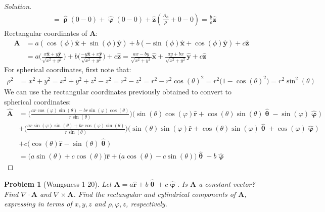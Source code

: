 \documentclass{article}
\theoremstyle{mystyle}
\newtheorem{problem}{Problem}[section]
\begin{document}
\begin{proof}[Solution]
\begin{align*}
    &=\hat{\boldsymbol{\uprho}}(0-0)+\hat{\boldsymbol{\upvarphi}}(0-0)+\hat{\mathbf{z}}(\frac{A_\phi}{\rho} +0-0)=\frac{b}{\rho}\hat{\mathbf{z}}
\end{align*}
Rectangular coordinates of $\mathbf{A}$:
\begin{align*}
    \mathbf{A} &= a(\cos(\phi)\hat{\mathbf{x}}+\sin(\phi)\hat{\mathbf{y}})+b(-\sin(\phi)\hat{\mathbf{x}}+\cos(\phi)\hat{\mathbf{y}})+c\hat{\mathbf{z}}\\
    &= a\bigg(\frac{x\hat{\mathbf{x}}+y\hat{\mathbf{y}}}{\sqrt{x^2+y^2}}\bigg)+b\bigg(\frac{-y\hat{\mathbf{x}}+x\hat{\mathbf{y}}}{\sqrt{x^2+y^2}}\bigg)+c\hat{\mathbf{z}}=\frac{ax-by}{\sqrt{x^2+y^2}}\hat{\mathbf{x}}+\frac{ay+bx}{\sqrt{x^2+y^2}}\hat{\mathbf{y}}+c\hat{\mathbf{z}}
\end{align*}
For spherical coordinates, first note that:
\begin{align*}
    \rho^{2}&=x^{2}+y^{2}=x^2+y^2+z^2-z^2=r^2-z^2=r^{2}-r^{2}\cos(\theta)^2=r^2\big(1-\cos(\theta)^2\big)=r^2\sin^2(\theta)
\end{align*}
We can use the rectangular coordinates previously obtained to convert to spherical coordinates:
\begin{align*}
    \hat{\mathbf{A}} &= \bigg(\frac{ar\cos(\varphi)\sin(\theta)-br\sin(\varphi)\cos(\theta)}{r\sin(\theta)}\bigg)\big(\sin(\theta)\cos(\varphi)\hat{\mathbf{r}}+\cos(\theta)\sin(\theta)\hat{\boldsymbol{\uptheta}}-\sin(\varphi)\hat{\boldsymbol{\upvarphi}}\big)\\
    &+\bigg(\frac{ar\sin(\varphi)\sin(\theta)+br\cos(\varphi)\sin(\theta)}{r\sin(\theta)}\bigg)\big(\sin(\theta)\sin(\varphi)\hat{\mathbf{r}}+\cos(\theta)\sin(\varphi)\hat{\boldsymbol{\uptheta}}+\cos(\varphi)\hat{\boldsymbol{\upvarphi}}\big)\\
    &+c\big(\cos(\theta)\hat{\mathbf{r}}-\sin(\theta)\hat{\boldsymbol{\uptheta}}\big)\\
    &= \big(a\sin(\theta)+c\cos(\theta)\big)\hat{\mathbf{r}}+\big(a\cos(\theta)-c\sin(\theta)\big)\hat{\boldsymbol{\uptheta}}+b\hat{\boldsymbol{\upvarphi}}
\end{align*}
\end{proof}
\begin{problem}[Wangsness 1-20]
Let $\mathbf{A} = a\hat{\mathbf{r}} + b\hat{\boldsymbol{\uptheta}}+c\hat{\boldsymbol{\upvarphi}}$. Is $\mathbf{A}$ a constant vector? Find $\nabla\cdot \mathbf{A}$ and $\nabla\times \mathbf{A}$. Find the rectangular and cylindrical components of $\mathbf{A}$, expressing in terms of $x,y,z$ and $\rho,\varphi,z$, respectively.
\end{problem}
\end{document}
